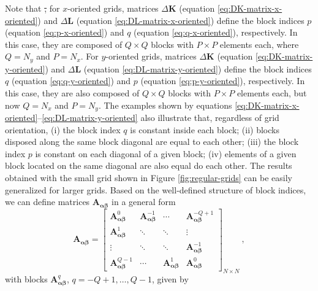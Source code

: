 \documentclass[manuscript]{geophysics}
\providecommand{\DIFdeltex}[1]{{\protect\color{red}\sout{#1}}}                      %
\providecommand{\DIFdelbegin}{} %
\providecommand{\DIFdelend}{} %
\providecommand{\DIFdel}[1]{\texorpdfstring{\DIFdeltex{#1}}{}} %
\begin{document}
	Note that \DIFdelbegin \DIFdel{, }\DIFdelend for $x$-oriented grids, matrices $\Delta\mathbf{K}$ (equation \ref{eq:DK-matrix-x-oriented})
	and $\Delta\mathbf{L}$ (equation \ref{eq:DL-matrix-x-oriented}) define the block indices
	$p$ (equation \ref{eq:p-x-oriented}) and $q$ (equation \ref{eq:q-x-oriented}), respectively.
	In this case, they are composed of $Q \times Q$ blocks with $P \times P$ elements each, where 
	$Q = N_{y}$ and $P = N_{x}$. 
	For $y$-oriented grids, matrices $\Delta\mathbf{K}$ (equation \ref{eq:DK-matrix-y-oriented})
	and $\Delta\mathbf{L}$ (equation \ref{eq:DL-matrix-y-oriented}) define the block indices
	$q$ (equation \ref{eq:q-y-oriented}) and $p$ (equation \ref{eq:p-y-oriented}), respectively.
	In this case, they are also composed of $Q \times Q$ blocks with $P \times P$ elements each, 
	but now $Q = N_{x}$ and $P = N_{y}$.
	The examples shown by equations \ref{eq:DK-matrix-x-oriented}--\ref{eq:DL-matrix-y-oriented}
	also illustrate that, regardless of grid orientation, (i) the block index $q$ is constant 
	inside each block; (ii) blocks disposed along the same block diagonal are equal to each other; 
	(iii) the block index $p$ is constant on each diagonal of a given block; 
	(iv) elements of a given block located on the same diagonal are also equal do each other.
	The results obtained with the small grid shown in Figure \ref{fig:regular-grids}
	can be easily generalized for larger grids.
	Based on the well-defined structure of block indices, we can define 
	matrices $\mathbf{A_{\boldsymbol{\alpha\beta}}}$ in a general form
	\begin{equation}
		\mathbf{A}_{\boldsymbol{\alpha\beta}} = \begin{bmatrix}
			\mathbf{A}_{\boldsymbol{\alpha\beta}}^{0}   & \mathbf{A}_{\boldsymbol{\alpha\beta}}^{-1} & \cdots          & \mathbf{A}_{\boldsymbol{\alpha\beta}}^{-Q+1} \\
			\mathbf{A}_{\boldsymbol{\alpha\beta}}^{1}   & \ddots          & \ddots          & \vdots           \\ 
			\vdots           & \ddots          & \ddots          & \mathbf{A}_{\boldsymbol{\alpha\beta}}^{-1}   \\
			\mathbf{A}_{\boldsymbol{\alpha\beta}}^{Q-1} & \cdots          & \mathbf{A}_{\boldsymbol{\alpha\beta}}^{1}  & \mathbf{A}_{\boldsymbol{\alpha\beta}}^{0}
		\end{bmatrix}_{N \times N} \: ,
		\label{eq:BTTB_A_alpha_beta}
	\end{equation}
	with blocks $\mathbf{A}_{\boldsymbol{\alpha\beta}}^{q}$, $q = -Q+1, \dots, Q-1$, given by
\end{document}
